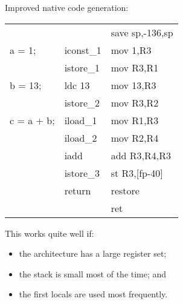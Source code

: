 \begin{slide*}
\renewcommand{\arraystretch}{0.9}
Improved native code generation:
\vspace*{0.5ex}
 
\begin{center}
\begin{scriptsize}
\begin{tt}
\begin{tabular}{l@{~~~}l@{~~~}l}
                 &                    &      save sp,-136,sp\\
a = 1;           &       iconst\_1     &      mov 1,R3\\
                 &       istore\_1     &      mov R3,R1\\
b = 13;          &       ldc 13    &      mov 13,R3\\
                 &       istore\_2     &      mov R3,R2\\
c = a + b;       &       iload\_1      &      mov R1,R3\\
                 &       iload\_2      &      mov R2,R4\\
                 &       iadd         &      add R3,R4,R3\\
                 &       istore\_3     &      st R3,[fp-40]\\
                 &       return       &      restore\\
                 &                    &      ret
\end{tabular}
\end{tt}
\end{scriptsize}
\end{center}
\vspace*{2em}

This works quite well if:
\begin{itemize}
\item the architecture has a large register set;
\item the stack is small most of the time; and
\item the first locals are used most frequently.
\end{itemize}
\renewcommand{\arraystretch}{1}
\vfil
\end{slide*}
 
